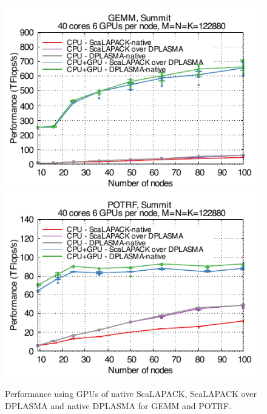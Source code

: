 \begin{figure}
\centering\includegraphics[width=.9\linewidth]{projects/2.3.1-PMR/2.3.1.09-ParSEC/scalapack_GEMM.pdf}
\centering\includegraphics[width=.9\linewidth]{projects/2.3.1-PMR/2.3.1.09-ParSEC/scalapack_POTRF.pdf}
\caption{Performance using GPUs of native ScaLAPACK, ScaLAPACK over
  DPLASMA and native DPLASMA for GEMM and
  POTRF.\label{fig:scalapack_gpu}}
\end{figure}
